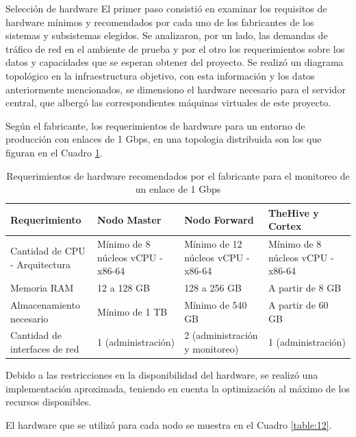     
    \begin{section}{Selección de hardware}
    \label{seleccion_hw}
        El primer paso consistió en examinar los requisitos de hardware mínimos y recomendados por cada uno de los fabricantes de los sistemas y subsistemas elegidos. Se analizaron, por un lado, las demandas de tráfico de red en el ambiente de prueba y por el otro los requerimientos sobre los datos y capacidades que se esperan obtener del proyecto. Se realizó un diagrama topológico en la infraestructura objetivo, con esta información y los datos anteriormente mencionados, se dimensiono el hardware necesario para el servidor central, que albergó las correspondientes máquinas virtuales de este proyecto.\par
        Según el fabricante, los requerimientos de hardware para un entorno de producción con enlaces de 1 Gbps, en una topologia distribuida son los que figuran en el Cuadro \ref{table:5}.
        
        \begin{table}[H]
        \centering
        \begin{tabular}{|m{9em}|m{9em}|m{9em}|m{9em}|}
        
            \hline 
                Requerimiento  & Nodo Master &  Nodo Forward & TheHive y Cortex \\ 
            \hline
                Cantidad de CPU - Arquitectura & Mínimo de 8 núcleos vCPU - x86-64 & Mínimo de 12 núcleos vCPU - x86-64 & Mínimo de 8 núcleos vCPU - x86-64 \\ 
            \hline
                Memoria RAM  & 12 a 128 GB & 128 a 256 GB & A partir de 8 GB \\ 
            \hline
                Almacenamiento necesario & Mínimo de 1 TB  & Mínimo de 540 GB & A partir de 60 GB \\
        \hline
        Cantidad de interfaces de red & 1 (administración) & 2 (administración y monitoreo) & 1 (administración) \\
            \hline %
        \end{tabular}
        \caption{Requerimientos de hardware recomendados por el fabricante para el monitoreo de un enlace de 1 Gbps}
        \label{table:5}
        \end{table}
        
        Debido a las restricciones en la disponibilidad del hardware, se realizó una implementación aproximada, teniendo en cuenta la optimización al máximo de los recursos disponibles. \par
	    El hardware que se utilizó para cada nodo se muestra en el Cuadro \ref{table:12}.


\end{section}
